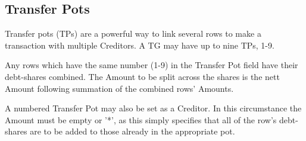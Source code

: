 \documentclass{report}
\begin{document}
\subsection{Transfer Pots}\label{tps}

Transfer pots (TPs) are a powerful way to link several rows to make a transaction with multiple Creditors. A TG may have up to nine TPs, 1-9.

Any rows which have the same number (1-9) in the Transfer Pot field have their debt-shares combined. The Amount to be split across the shares is the nett Amount following summation of the combined rows' Amounts.

A numbered Transfer Pot may also be set as a Creditor. In this circumstance the Amount must be empty or '*', as this simply specifies that all of the row's debt-shares are to be added to those already in the appropriate pot.
\end{document}
